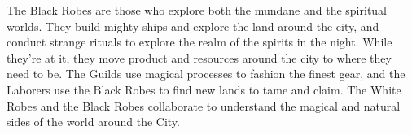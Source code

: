 The Black Robes are those who explore both the mundane and the spiritual worlds. They build mighty ships and explore the land around the city, and conduct strange rituals to explore the realm of the spirits in the night. While they’re at it, they move product and resources around the city to where they need to be. The Guilds use magical processes to fashion the finest gear, and the Laborers use the Black Robes to find new lands to tame and claim. The White Robes and the Black Robes collaborate to understand the magical and natural sides of the world around the City.
